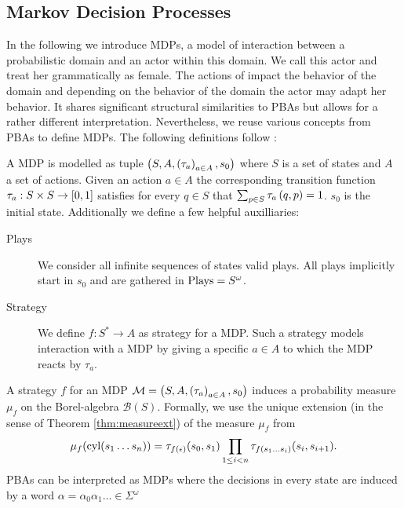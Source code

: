 \subsection{Markov Decision Processes}
In the following we introduce \acp{MDP}, a model of interaction between a 
probabilistic domain and an actor within this domain. We call this actor \eve{} 
and treat her grammatically as female. The actions of \eve{} impact the 
behavior of the domain and depending on the behavior of the domain the actor 
may adapt her behavior. It shares significant structural similarities to 
\acp{PBA} but allows for a rather different interpretation. Nevertheless, we
reuse various concepts from \acp{PBA} to define \acp{MDP}. The following 
definitions follow \cite{RandAutoInfTrees}:
\begin{definition}
  A \acl*{MDP} is modelled as tuple
  $\left(S, A, \left(\tau_{a}\right)_{a\in A}, s_{0}\right)$ where $S$ is a set of states
  and $A$ a set of actions. Given an action $a\in A$ the corresponding
  transition function $\tau_{a}:S\times S\rightarrow \left[0,1\right]$ satisfies
  for every $q\in S$ that $\sum_{p\in S}\tau_{a}\left(q,p\right) = 1$.
  $s_{0}$ is the initial state. Additionally we define a few helpful
  auxilliaries:
  \begin{description}
    \item [Plays] We consider all infinite sequences of states
      valid plays. All plays implicitly start in $s_{0}$ and are gathered in
      $\operatorname{Plays} = S^{\omega}$.
    \item [Strategy] We define $f:S^{*}\rightarrow A$ as strategy for
      a \ac{MDP}. Such a strategy models interaction with a \ac{MDP} by
      giving a specific $a\in A$ to which the \ac{MDP} reacts by $\tau_{a}$.
  \end{description}
  \label{def:mdp}
\end{definition}
A strategy $f$ for an \ac{MDP} $\mathcal{M} = \left(S, A, 
\left(\tau_{a}\right)_{a\in A}, s_{0}\right)$ induces a probability measure $\mu_{f}$ on 
the Borel-algebra $\mathcal{B}(S)$. Formally, we use the unique extension (in 
the sense of Theorem \ref{thm:measureext}) of the measure $\mu_{f}$ from
\begin{equation*}
  \mu_{f}(\operatorname{cyl}(s_{1}\dots s_{n})) = \tau_{f(\epsilon)}(s_{0}, s_{1})
    \prod_{1\leq i < n}\tau_{f(s_{1}\dots s_{i})}(s_{i}, s_{i+1}).
\end{equation*}
\acp{PBA} can be interpreted as \acp{MDP} where the decisions in every state
are induced by a word $\alpha = \alpha_{0}\alpha_{1}\dots\in\Sigma^{\omega}$
